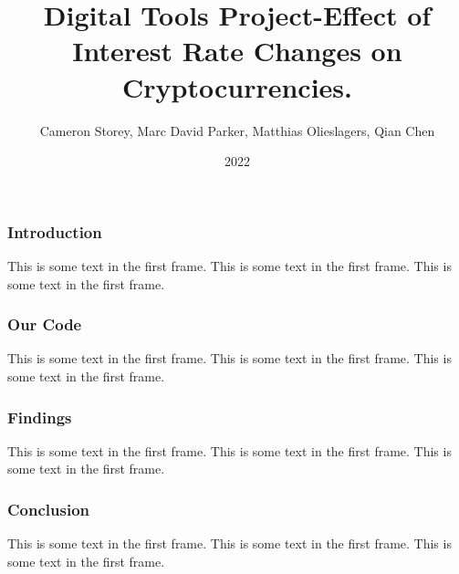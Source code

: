 \documentclass{beamer}
\title{Digital Tools Project-Effect of Interest Rate Changes on Cryptocurrencies.}
\author{Cameron Storey, Marc David Parker, Matthias Olieslagers, Qian Chen}
\institute{UZH Digital Tools for Finance}
\date{2022}
\begin{document}
\frame{\titlepage}

\begin{frame}
\frametitle{Introduction}
This is some text in the first frame. This is some text in the first frame. This is some text in the first frame.
\end{frame}

\begin{frame}
    \frametitle{Our Code}
    This is some text in the first frame. This is some text in the first frame. This is some text in the first frame.
\end{frame}

\begin{frame}
    \frametitle{Findings}
    This is some text in the first frame. This is some text in the first frame. This is some text in the first frame.
\end{frame}

\begin{frame}
    \frametitle{Conclusion}
    This is some text in the first frame. This is some text in the first frame. This is some text in the first frame.
\end{frame}
\end{document}
